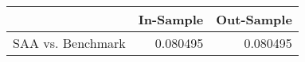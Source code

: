 \begin{tabular}{lrr}
\toprule
{} &  In-Sample &  Out-Sample \\
\midrule
SAA vs. Benchmark &   0.080495 &    0.080495 \\
\bottomrule
\end{tabular}
